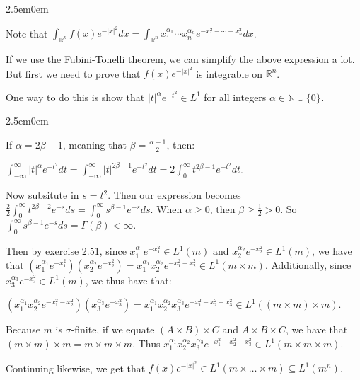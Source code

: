 \documentclass{book}
\newcommand{\exTwoP}{%
   \color{RedViolet}%
   \fontsize{13}{15}\selectfont%
}
\newcommand{\exPPP}{%
   \color{VioletRed}%
   \fontsize{12}{14}\selectfont%
}
\newenvironment{myIndent}{%
   \begin{adjustwidth}{2.5em}{0em}%
}{%
   \end{adjustwidth}%
}
\newcommand{\retTwo}{\hfill\bigbreak}
\begin{document}
\begin{myIndent}\exTwoP
	Note that $\int_{\mathbb{R}^n} f(x)e^{-|x|^2}dx = \int_{\mathbb{R}^n} x_1^{\alpha_1}\cdots x_n^{\alpha_n}e^{-x_1^2 - \cdots - x_n^2}dx$.\retTwo

	If we use the Fubini-Tonelli theorem, we can simplify the above expression a lot. But first we need to prove that $f(x)e^{-|x|^2}$ is integrable on $\mathbb{R}^n$.\retTwo

	One way to do this is show that $|t|^\alpha e^{-t^2} \in L^1$ for all integers $\alpha \in \mathbb{N} \cup \{0\}$.
	
	\begin{myIndent}\exPPP
		If $\alpha = 2\beta - 1$, meaning that $\beta = \frac{\alpha + 1}{2}$, then:
		
		{\centering $\int_{-\infty}^\infty |t|^\alpha e^{-t^2}dt = \int_{-\infty}^\infty |t|^{2\beta - 1} e^{-t^2}dt = 2\int_0^\infty t^{2\beta - 1}e^{-t^2}dt$.\retTwo\par}
		
		Now subsitute in $s = t^2$. Then our expression becomes $\frac{2}{2}\int_0^\infty t^{2\beta - 2}e^{-s}ds = \int_0^\infty s^{\beta - 1}e^{-s}ds$. When $\alpha \geq 0$, then $\beta \geq \frac{1}{2} > 0$. So $\int_0^\infty s^{\beta - 1}e^{-s}ds = \Gamma(\beta) < \infty$.\retTwo
	\end{myIndent}

	Then by exercise 2.51, since $x_1^{\alpha_1} e^{-x_1^2} \in L^1(m)$ and $x_2^{\alpha_2} e^{-x_2^2} \in L^1(m)$, we have that $\left(x_1^{\alpha_1} e^{-x_1^2}\right)\left(x_2^{\alpha_2} e^{-x_2^2}\right) = x_1^{\alpha_1}x_2^{\alpha_2}e^{-x_1^2 - x_2^2} \in L^1(m \times m)$. Additionally, since $x_3^{\alpha_3} e^{-x_3^2} \in L^1(m)$, we thus have that:
	
	{\centering $\left(x_1^{\alpha_1}x_2^{\alpha_2}e^{-x_1^2 - x_2^2}\right)\left(x_3^{\alpha_3} e^{-x_3^2}\right) = x_1^{\alpha_1}x_2^{\alpha_2}x_3^{\alpha_3}e^{-x_1^2 - x_2^2 - x_3^2} \in L^1((m \times m) \times m)$.
	\newpage\par}
	
	Because $m$ is $\sigma$-finite, if we equate $(A \times B) \times C$ and $A \times B \times C$, we have that $(m \times m) \times m = m \times m \times m$. Thus $x_1^{\alpha_1}x_2^{\alpha_2}x_3^{\alpha_3}e^{-x_1^2 - x_2^2 - x_3^2} \in L^1(m \times m \times m)$.\retTwo
	
	Continuing likewise, we get that $f(x)e^{-|x|^2} \in L^1(m \times \ldots \times m) \subseteq L^1(m^n)$.\retTwo


\end{myIndent}
\end{document}
